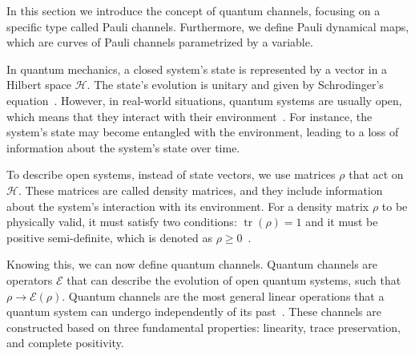 \documentclass[10pt,letterpaper]{article} %
\DeclareMathOperator{\tr}{tr}
\begin{document}
In this section   we introduce the
concept of quantum channels, focusing on a specific type called Pauli channels.
Furthermore, we define Pauli dynamical maps, which
are curves of Pauli channels parametrized by a variable.



In quantum mechanics, a closed system's state is represented by a vector in a
Hilbert space $\mathcal{H}$.  The state's evolution is unitary and given by
Schrodinger's equation~\cite{Rieffel}.  However, in real-world situations,
quantum systems are usually open, which means that they interact with their
environment~\cite{Breuer}.  For instance, the system's state may become
entangled with the environment, leading to a loss of information about the
system's state over time.

To describe open systems, instead of state vectors,
we use matrices $\rho$ that act on $\mathcal{H}$.
These matrices are called density matrices, and they include information about the system's interaction with its environment. 
For a density matrix $\rho$ to be physically valid, 
it must satisfy two conditions: $\tr(\rho) = 1$ and it must be positive semi-definite,
which is denoted as $\rho \geq 0$~\cite{chuangbook}.


Knowing this, we can now define quantum channels.
Quantum channels are operators $\mathcal{E}$ that
can describe the evolution of open quantum systems, such that $\rho \rightarrow \mathcal{E}(\rho)$.
Quantum channels are the most general linear operations
that a quantum system can undergo independently of its
past~\cite{zimansbook,cirac}.
These channels are constructed based on three fundamental properties: 
linearity, trace preservation, and complete positivity.
\end{document}

